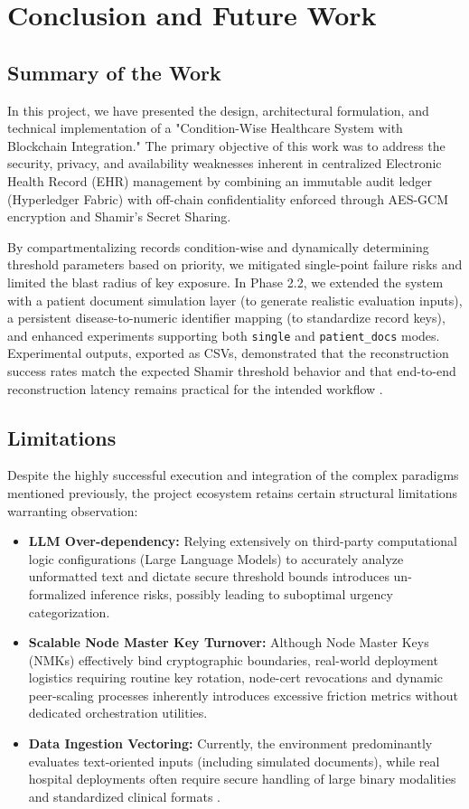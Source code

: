 \chapter{Conclusion and Future Work}

\section{Summary of the Work}
In this project, we have presented the design, architectural formulation, and technical implementation of a "Condition-Wise Healthcare System with Blockchain Integration." The primary objective of this work was to address the security, privacy, and availability weaknesses inherent in centralized Electronic Health Record (EHR) management by combining an immutable audit ledger (Hyperledger Fabric) with off-chain confidentiality enforced through AES-GCM encryption and Shamir's Secret Sharing.

By compartmentalizing records condition-wise and dynamically determining threshold parameters based on priority, we mitigated single-point failure risks and limited the blast radius of key exposure. In Phase 2.2, we extended the system with a patient document simulation layer (to generate realistic evaluation inputs), a persistent disease-to-numeric identifier mapping (to standardize record keys), and enhanced experiments supporting both \texttt{single} and \texttt{patient\_docs} modes. Experimental outputs, exported as CSVs, demonstrated that the reconstruction success rates match the expected Shamir threshold behavior and that end-to-end reconstruction latency remains practical for the intended workflow \cite{kumar2021ensemble, li2023privacy}.

\section{Limitations}
Despite the highly successful execution and integration of the complex paradigms mentioned previously, the project ecosystem retains certain structural limitations warranting observation:
\begin{itemize}
    \item \textbf{LLM Over-dependency:} Relying extensively on third-party computational logic configurations (Large Language Models) to accurately analyze unformatted text and dictate secure threshold bounds introduces un-formalized inference risks, possibly leading to suboptimal urgency categorization.
    \item \textbf{Scalable Node Master Key Turnover:} Although Node Master Keys (NMKs) effectively bind cryptographic boundaries, real-world deployment logistics requiring routine key rotation, node-cert revocations and dynamic peer-scaling processes inherently introduces excessive friction metrics without dedicated orchestration utilities.
    \item \textbf{Data Ingestion Vectoring:} Currently, the environment predominantly evaluates text-oriented inputs (including simulated documents), while real hospital deployments often require secure handling of large binary modalities and standardized clinical formats \cite{kumar2021ensemble}.
\end{itemize}

